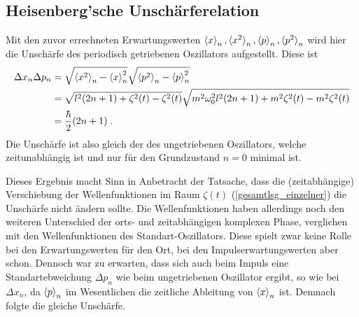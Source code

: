   \subsection{Heisenberg'sche Unschärferelation}
    Mit den zuvor errechneten Erwartungswerten $\braket{x}_n,\braket{x^2}_n,\braket{p}_n,\braket{p^2}_n$ wird hier die Unschärfe des periodisch getriebenen Oszillators aufgestellt.
    Diese ist
    \begin{align}
      \Delta x_n\Delta p_n &= \sqrt{\braket{x^2}_n-\braket{x}^2_n}\sqrt{\braket{p^2}_n-\braket{p}^2_n} \notag\\
      &= \sqrt{l^2(2n+1)+\zeta^2(t)-\zeta^2(t)}\sqrt{m^2\omega^2_0l^2(2n+1)+m^2\zeta^2(t)-m^2\zeta^2(t)} \notag\\
      &= \frac{\hbar}{2}(2n+1) \; .
    \end{align}
    Die Unschärfe ist also gleich der des ungetriebenen Oszillators, welche zeitunabhängig ist und nur für den Grundzustand $n=0$ minimal ist.

    Dieses Ergebnis macht Sinn in Anbetracht der Tatsache, dass die (zeitabhängige) Verschiebung der Wellenfunktionen im Raum $\zeta(t)$ (\ref{gesamtlsg_einzelner}) die Unschärfe nicht ändern sollte.
    Die Wellenfunktionen haben allerdings noch den weiteren Unterschied der orts- und zeitabhängigen komplexen Phase, verglichen mit den Wellenfunktionen des Standart-Oszillators.
    Diese spielt zwar keine  Rolle bei den Erwartungswerten für den Ort, bei den Impulserwartungswerten aber schon.
    Dennoch war zu erwarten, dass sich auch beim Impuls eine Standartebweichung $\Delta p_n$ wie beim ungetriebenen Oszillator ergibt, so wie bei $\Delta x_n$, da $\braket{p}_n$ im Wesentlichen die zeitliche Ableitung von $\braket{x}_n$ ist.
    Demnach folgte die gleiche Unschärfe.


\iffalse
  \subsection{Erwartungswerte für die Energie}
    Hier werden wir den normalen zeitabhängigen Erwartungswert der Energie $\braket{H(t)}_n$ aufstellen.
    Weiterhin wird der zeitlich, über eine Periode $T$, gemittelten Erwartungswert $\bar H_n$ mittels Formel (\ref{mittleres_H}) für eine beliebige Treibkraft bestimmt, indem wir die Quasienergien $\epsilon_n$ benutzen, welche wir in Kapitel \ref{espsilon_bel_kraft} für eine allgemeine periodische Treibkraft $S(t)$, in Abhängigkeit deren  Fourier-Koeffizienten, bestimmt haben.
\fi

